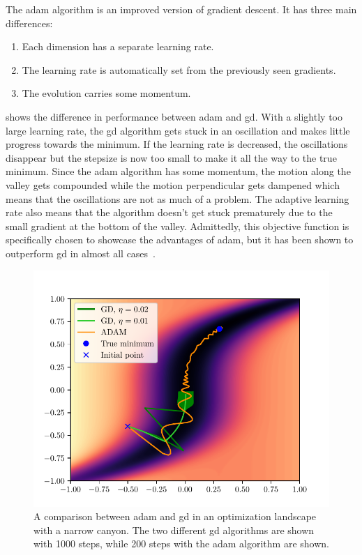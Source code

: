 The \gls{adam} algorithm is an improved version of gradient descent.
It has three main differences:
\begin{enumerate}
	\item Each dimension has a separate learning rate.
	\item The learning rate is automatically set from the previously seen gradients.
	\item The evolution carries some momentum.
\end{enumerate}
 shows the difference in performance between \gls{adam}
and \gls{gd}.
With a slightly too large learning rate, the \gls{gd} algorithm gets stuck in an
oscillation and makes little progress towards the minimum.
If the learning rate is decreased, the oscillations disappear but the stepsize
is now too small to make it all the way to the true minimum.
Since the \gls{adam} algorithm has some momentum, the motion along the valley
gets compounded while the motion perpendicular gets dampened which means that
the oscillations are not as much of a problem.
The adaptive learning rate also means that the algorithm doesn't get stuck
prematurely due to the small gradient at the bottom of the valley.
Admittedly, this objective function is specifically chosen to showcase the
advantages of \gls{adam}, but it has been shown to outperform \gls{gd} in almost
all cases~\cite{kingma2017adam}.
\begin{figure}[htpb]
	\centering
	\includegraphics{chapters/theory/adam_vs_gd_plot.pdf}
	\caption{
		A comparison between \gls{adam} and \gls{gd} in an optimization
		landscape with a narrow canyon. The two different \gls{gd} algorithms
		are shown with 1000 steps, while 200 steps with the \gls{adam} algorithm
		are shown.
	}
	\label{fig:adam_vs_gd}
\end{figure}

